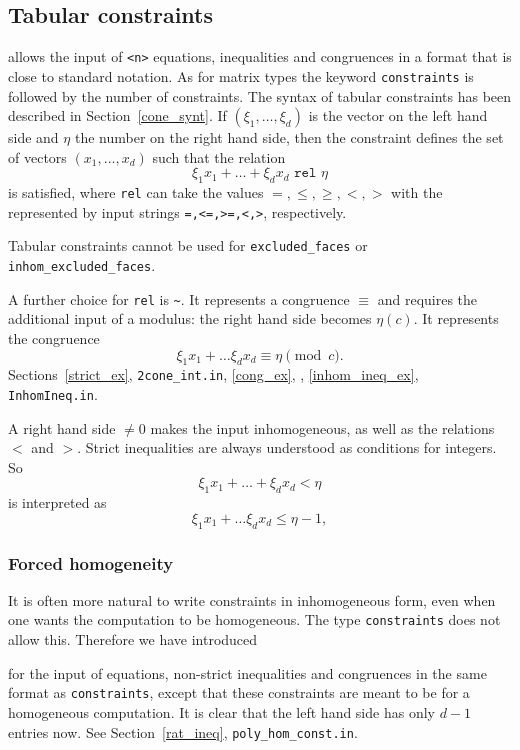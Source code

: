 \subsection{Tabular constraints}

\begin{itemize}
	\itemtt[constraints <n>] allows the input of \verb|<n>| equations, inequalities and congruences in a format that is close to standard notation. As for matrix types the keyword \verb|constraints| is followed by the number of constraints. The syntax of tabular constraints has been described in Section~\ref{cone_synt}. If $(\xi_1,\dots,\xi_d)$ is the vector on the left hand side and $\eta$ the number on the right hand side, then the constraint defines the set of vectors $(x_1,\dots,x_d)$ such that the relation
	$$
	\xi_1x_1+\dots +\xi_dx_d \texttt{ rel } \eta
	$$
	is satisfied, where \verb|rel| can take the values $=,\leq,\geq,<,>$ with the represented by input strings \verb|=,<=,>=,<,>|, respectively.
	
	Tabular constraints cannot be used for \verb|excluded_faces| or \verb|inhom_excluded_faces|.
	
	A further choice for \verb|rel| is \verb|~|. It represents a congruence $\equiv$ and requires the additional input of a modulus: the right hand side becomes $\eta (c)$. It represents the congruence
	$$
	\xi_1x_1+\dots \xi_dx_d \equiv \eta \pmod c.
	$$
	Sections~\ref{strict_ex}, \verb|2cone_int.in|, \ref{cong_ex}, , \ref{inhom_ineq_ex}, \verb|InhomIneq.in|.
\end{itemize}

A right hand side $\neq 0$ makes the input inhomogeneous, as well as the relations $<$ and $>$. Strict inequalities are always understood as conditions for integers. So
$$
\xi_1x_1+\dots +\xi_dx_d < \eta
$$
is interpreted as
$$
\xi_1x_1+\dots \xi_dx_d \le \eta-1,
$$


\subsubsection{Forced homogeneity}

It is often more natural to write constraints in inhomogeneous form, even when one wants the computation to be homogeneous. The type \verb|constraints| does not allow this. Therefore we have introduced
\begin{itemize}
	 for the input of equations, non-strict inequalities and congruences in the same format as \verb|constraints|, except that these constraints are meant to be for a homogeneous computation. It is clear that the left hand side has only $d-1$ entries now. See Section~\ref{rat_ineq}, \verb|poly_hom_const.in|.
\end{itemize}

